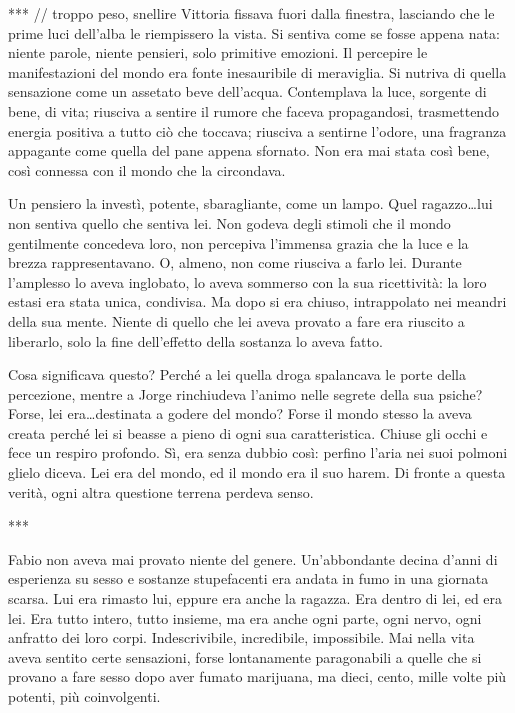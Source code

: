 ***
// troppo peso, snellire
Vittoria fissava fuori dalla finestra, lasciando che le prime luci dell'alba le riempissero la vista. Si sentiva come se fosse appena nata: niente parole, niente pensieri, solo primitive emozioni. Il percepire le manifestazioni del mondo era fonte inesauribile di meraviglia. Si nutriva di quella sensazione come un assetato beve dell'acqua. Contemplava la luce, sorgente di bene, di vita; riusciva a sentire il rumore che faceva propagandosi, trasmettendo energia positiva a tutto ciò che toccava; riusciva a sentirne l'odore, una fragranza appagante come quella del pane appena sfornato. Non era mai stata così bene, così connessa con il mondo che la circondava.

Un pensiero la investì, potente, sbaragliante, come un lampo. Quel ragazzo\ldots lui non sentiva quello che sentiva lei. Non godeva degli stimoli che il mondo gentilmente concedeva loro, non percepiva l'immensa grazia che la luce e la brezza rappresentavano. O, almeno, non come riusciva a farlo lei. Durante l'amplesso lo aveva inglobato, lo aveva sommerso con la sua ricettività: la loro estasi era stata unica, condivisa. Ma dopo si era chiuso, intrappolato nei meandri della sua mente. Niente di quello che lei aveva provato a fare era riuscito a liberarlo, solo la fine dell'effetto della sostanza lo aveva fatto.

Cosa significava questo? Perché a lei quella droga spalancava le porte della percezione, mentre a Jorge rinchiudeva l'animo nelle segrete della sua psiche? Forse, lei era\ldots destinata a godere del mondo? Forse il mondo stesso la aveva creata perché lei si beasse a pieno di ogni sua caratteristica. Chiuse gli occhi e fece un respiro profondo. Sì, era senza dubbio così: perfino l'aria nei suoi polmoni glielo diceva. Lei era del mondo, ed il mondo era il suo harem. Di fronte a questa verità, ogni altra questione terrena perdeva senso.

***

Fabio non aveva mai provato niente del genere. Un'abbondante decina d'anni di esperienza su sesso e sostanze stupefacenti era andata in fumo in una giornata scarsa. Lui era rimasto lui, eppure era anche la ragazza. Era dentro di lei, ed era lei. Era tutto intero, tutto insieme, ma era anche ogni parte, ogni nervo, ogni anfratto dei loro corpi. Indescrivibile, incredibile, impossibile. Mai nella vita aveva sentito certe sensazioni, forse lontanamente paragonabili a quelle che si provano a fare sesso dopo aver fumato marijuana, ma dieci, cento, mille volte più potenti, più coinvolgenti.

